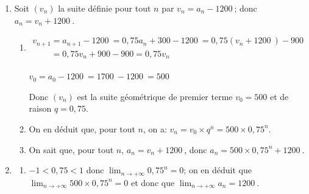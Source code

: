 \documentclass[10pt]{article}
\providecommand{\N}{\mathbb{N}}
\providecommand{\np}[2][]{{#2~#1}}
\providecommand{\ds}{\displaystyle}
\begin{document}
\begin{enumerate}
\begin{enumerate}

On a donc démontré que, pour tout $n$, $\np{1200} \leqslant a_{n+1} \leqslant a_{n} \leqslant \np{1700}$.
		
		\item Étude de la convergence de la suite $\left(a_{n}\right)$.
		
		
La suite $(a_n)_{n\in\N}$ est décroissante et minorée donc, d'après le théorème de la convergence monotone, elle est convergente.		
		
	\end{enumerate}
\item Soit $\left(v_{n}\right)$ la suite définie pour tout $n$ par $v_{n}=a_{n}- \np{1200}$; donc $a_n=v_n+\np{1200}$.
	\begin{enumerate}
		\item 
$\begin{gathered}v_{n+1}	= a_{n+1} -\np{1200} = 0,75 a_n +300 -\np{1200}
= 0,75\left (v_n+\np{1200}\right ) -900\\
\phantom{v_{n+1}}
= 0,75 v_n +900-900 = 0,75v_n\end{gathered}$	

$v_0=a_0-\np{1200}=\np{1700} - \np{1200} = 500$

Donc $(v_n)$ est la suite géométrique de premier terme $v_0=500$ et de raison $q=0,75$.		
		\item 
On en déduit que, pour tout $n$, on a: $v_n=v_0\times q^n = 500\times  0,75^n$.
		
		\item 
On sait que, pour tout $n$, $a_n=v_n+\np{1200}$, donc 	$a_n=500\times 0,75^n+\np{1200}$.
	\end{enumerate}
\item 
	\begin{enumerate}
		\item 
$-1<0,75<1$ donc $\ds\lim_{n\to +\infty} 0,75^n=0$;
on en déduit que $\ds\lim_{n\to +\infty}500\times 0,75^n=0$
et donc que $\ds\lim_{n\to +\infty} a_n=\np{1200}$.
				

\end{enumerate}
\end{enumerate}
\end{document}
